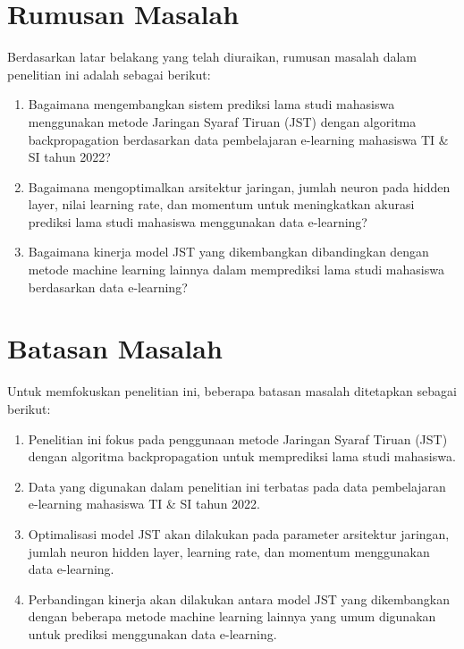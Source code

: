\section{Rumusan Masalah}
Berdasarkan latar belakang yang telah diuraikan, rumusan masalah dalam penelitian ini adalah sebagai berikut:
    \begin{enumerate}
        \item Bagaimana mengembangkan sistem prediksi lama studi mahasiswa menggunakan metode Jaringan Syaraf Tiruan (JST) dengan algoritma backpropagation berdasarkan data pembelajaran e-learning mahasiswa TI & SI tahun 2022?
        \item Bagaimana mengoptimalkan arsitektur jaringan, jumlah neuron pada hidden layer, nilai learning rate, dan momentum untuk meningkatkan akurasi prediksi lama studi mahasiswa menggunakan data e-learning?
        \item Bagaimana kinerja model JST yang dikembangkan dibandingkan dengan metode machine learning lainnya dalam memprediksi lama studi mahasiswa berdasarkan data e-learning?
    \end{enumerate}

\section{Batasan Masalah}
Untuk memfokuskan penelitian ini, beberapa batasan masalah ditetapkan sebagai berikut:
    \begin{enumerate}
        \item Penelitian ini fokus pada penggunaan metode Jaringan Syaraf Tiruan (JST) dengan algoritma backpropagation untuk memprediksi lama studi mahasiswa.
        \item Data yang digunakan dalam penelitian ini terbatas pada data pembelajaran e-learning mahasiswa TI & SI tahun 2022.
        \item Optimalisasi model JST akan dilakukan pada parameter arsitektur jaringan, jumlah neuron hidden layer, learning rate, dan momentum menggunakan data e-learning.
        \item Perbandingan kinerja akan dilakukan antara model JST yang dikembangkan dengan beberapa metode machine learning lainnya yang umum digunakan untuk prediksi menggunakan data e-learning.
    \end{enumerate}

